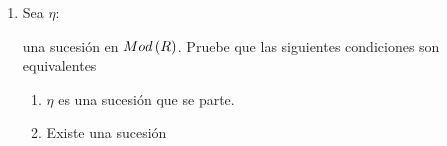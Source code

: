 \documentclass{article}
\begin{document}
\begin{enumerate}[label=\textbf{Ej \arabic*.}]
\begin{proof}
		\begin{align*}
			rz+w&=r\lrprth{f\lrprth{a_z}+j_z}+f\lrprth{a_w}+j_w\\
			&=f\lrprth{ra_z+a_w}+rj_z+j_w.
		\end{align*}
		Aplicando el hecho de que $J$ es un submódulo de $M$ y $\lrprth{\ref{unicidadsdf}}$ a lo anterior se sigue que 
		\begin{align*}
			\varphi\lrprth{rz+w}&=ra_z+a_w\\
			&=rf(z)+f(w).
		\intertext{Finalmente notemos que, si $a\in M_1$, $\varphi f\lrprth{a}=\varphi\lrprth{f\lrprth{a}+0}=a$, así que $\varphi f=Id_{M_1}$}
		\therefore &\ f\text{ es un split-mono.} 
		\end{align*}
		Por otro lado, como $N=N'$, se tiene que $M=N'\oplus J$ y así
		\begin{align*}
			Ker\lrprth{\restrict{g}{J}}&=Ker\lrprth{g}\cap J\\
			&=N'\cap J=\genmod{0}{R},\\
			\intertext{y como $g$ es sobre}
			M_2&=g\lrprth{M}\\
			&=g\lrprth{\lrbrack{g(a+b)\ \vline\ a\in Ker\lrprth{g}, b\in J}}\\
			&=g\lrprth{\lrbrack{g(b)\ \vline\ b\in J}}\\
			&=g\lrprth{J}\\
			&=\restrict{g}{J}(J),\\
			&\implies \restrict{g}{J}:J\to M_2 \text{ es un isomorfismo.}
		\end{align*}
		Por lo anterior $\exists\ h\in\ringmodhom{R}{M_2}{J}$ tal que $h\restrict{g}{J}=Id_J$ y $\restrict{g}{J}h=Id_{M_2}$, con lo cual $Im\lrprth{h}=J$. Así $gh=\restrict{g}{J}h$ y por lo tanto $g$ es un split-epi.\\
 		\end{proof}
		\item Sea $\eta:$
		una sucesión en $Mod\left(R\right)$. Pruebe que las siguientes condiciones son equivalentes
		\begin{enumerate}
			\item $\eta$ es una sucesión que se parte.
			\item Existe una sucesión
\end{enumerate}
\end{enumerate}
\end{document}
